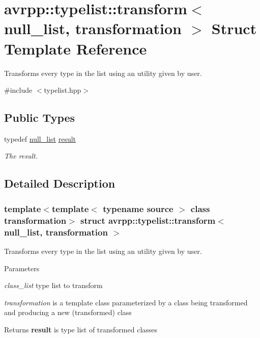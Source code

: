 \hypertarget{structavrpp_1_1typelist_1_1transform_3_01null__list_00_01transformation_01_4}{
\section{avrpp::typelist::transform$<$ null\_\-list, transformation $>$ Struct Template Reference}
\label{structavrpp_1_1typelist_1_1transform_3_01null__list_00_01transformation_01_4}
}


Transforms every type in the list using an utility given by user.  




{\ttfamily \#include $<$typelist.hpp$>$}

\subsection*{Public Types}
\begin{DoxyCompactItemize}
\item 
typedef \hyperlink{structavrpp_1_1typelist_1_1null__list}{null\_\-list} \hyperlink{structavrpp_1_1typelist_1_1transform_3_01null__list_00_01transformation_01_4_af438de175dc6b93e39795bc0913427c3}{result}
\begin{DoxyCompactList}\small\item\em The result. \item\end{DoxyCompactList}\end{DoxyCompactItemize}


\subsection{Detailed Description}
\subsubsection*{template$<$template$<$ typename source $>$ class transformation$>$ struct avrpp::typelist::transform$<$ null\_\-list, transformation $>$}

Transforms every type in the list using an utility given by user. 
\begin{DoxyParams}{Parameters}
\item[{\em class\_\-list}]type list to transform \item[{\em transformation}]is a template class parameterized by a class being transformed and producing a new (transformed) class \end{DoxyParams}
\begin{DoxyReturn}{Returns}
{\bfseries result} is type list of transformed classes 
\end{DoxyReturn}


